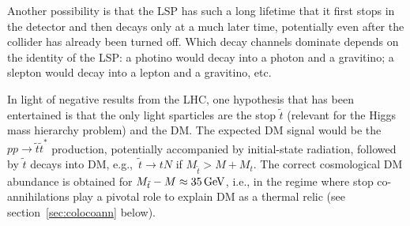 Another possibility is that the LSP has such a long lifetime that it first stops in the detector and then decays only at a much later time,
potentially even after the collider has already been turned off.
Which decay channels dominate depends on the identity of the LSP: a photino would decay into a photon and a gravitino;
a slepton would decay into a lepton and a gravitino, etc.




In light of negative results from the LHC, one hypothesis that has been entertained is that the only light sparticles are the stop $\tilde t$ (relevant for the Higgs mass hierarchy problem) and the DM.
The expected DM signal would be the $pp\to \tilde t \tilde t^*$ production, potentially accompanied by initial-state radiation,
followed by $\tilde t$ decays into DM,
e.g.,\ $\tilde t \to t N$ if $M_{\tilde t} > M + M_t$. 
The correct cosmological DM abundance is obtained for
$M_{\tilde t}- M \approx 35 \,{\rm GeV}$, i.e., in the regime where stop co-annihilations play a pivotal role to explain DM as a thermal relic (see section~\ref{sec:colocoann} below).


